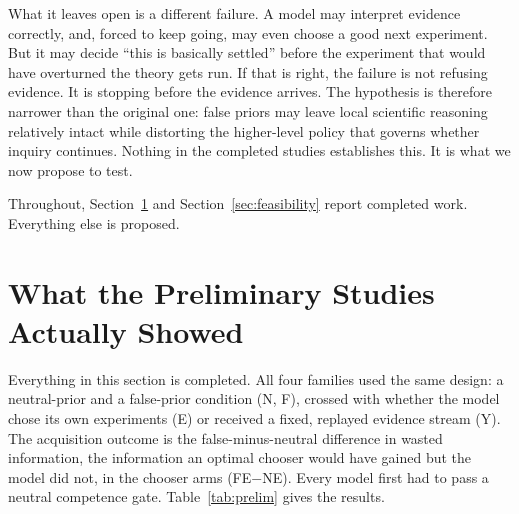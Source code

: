 \documentclass[10pt,letterpaper,twocolumn]{article}
\begin{document}
What it leaves open is a different failure. A model may interpret evidence correctly, and, forced to keep going, may even choose a good next experiment. But it may decide ``this is basically settled'' before the experiment that would have overturned the theory gets run. If that is right, the failure is not refusing evidence. It is stopping before the evidence arrives. The hypothesis is therefore narrower than the original one: false priors may leave local scientific reasoning relatively intact while distorting the higher-level policy that governs whether inquiry continues. Nothing in the completed studies establishes this. It is what we now propose to test.

Throughout, Section~\ref{sec:prelim} and Section~\ref{sec:feasibility} report completed work. Everything else is proposed.

\section{What the Preliminary Studies Actually Showed}
\label{sec:prelim}

Everything in this section is completed. All four families used the same design: a neutral-prior and a false-prior condition (N, F), crossed with whether the model chose its own experiments (E) or received a fixed, replayed evidence stream (Y). The acquisition outcome is the false-minus-neutral difference in wasted information, the information an optimal chooser would have gained but the model did not, in the chooser arms (FE$-$NE). Every model first had to pass a neutral competence gate. Table~\ref{tab:prelim} gives the results.
\end{document}
